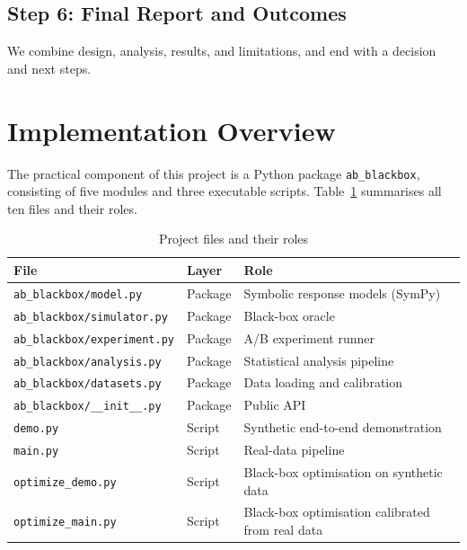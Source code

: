 \documentclass[a4paper,12pt]{extarticle}
\numberwithin{equation}{section}
\begin{document}
\subsection{Step 6: Final Report and Outcomes}
We combine design, analysis, results, and limitations, and end with a decision and next steps.

\clearpage

\section*{Implementation Overview}

The practical component of this project is a Python package
\texttt{ab\_blackbox}, consisting of five modules and three
executable scripts. Table~\ref{tab:files} summarises all ten
files and their roles.

\begin{table}[ht]
\centering
\caption{Project files and their roles}
\label{tab:files}
\begin{tabular}{lll}
\toprule
\textbf{File} & \textbf{Layer} & \textbf{Role} \\
\midrule
\texttt{ab\_blackbox/model.py}        & Package & Symbolic response models (SymPy) \\
\texttt{ab\_blackbox/simulator.py}    & Package & Black-box oracle \\
\texttt{ab\_blackbox/experiment.py}   & Package & A/B experiment runner \\
\texttt{ab\_blackbox/analysis.py}     & Package & Statistical analysis pipeline \\
\texttt{ab\_blackbox/datasets.py}     & Package & Data loading and calibration \\
\texttt{ab\_blackbox/\_\_init\_\_.py} & Package & Public API \\
\texttt{demo.py}                      & Script  & Synthetic end-to-end demonstration \\
\texttt{main.py}                      & Script  & Real-data pipeline \\
\texttt{optimize\_demo.py}  & Script & Black-box optimisation on synthetic data \\
\texttt{optimize\_main.py}  & Script & Black-box optimisation calibrated from real data \\
\bottomrule
\end{tabular}
\end{table}
\end{document}
